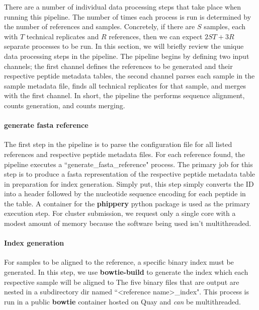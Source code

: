 \documentclass{article}
\begin{document}
There are a number of individual data processing steps that take place when running this pipeline.
The number of times each process is run is determined by the number of references and samples.
Concretely, if there are $S$ samples, each with $T$ technical replicates and $R$ references, then we can expect $2ST + 3R$ separate processes to be run. 
In this section, we will briefly review the unique data processing steps in the pipeline.
The pipeline begins by defining two input channels; 
the first channel defines the references to be generated and their respective peptide metadata tables,
the second channel parses each sample in the sample metadata file, finds all technical replicates for that sample, and merges with the first channel.
In short, the pipeline the performs sequence
alignment, counts generation, and counts merging.

\paragraph{generate fasta reference}
The first step in the pipeline is to parse the configuration file for all listed references and respective peptide metadata files. 
For each reference found, the pipeline executes a ``generate\_fasta\_reference" process.
The primary job for this step is to produce a fasta representation of the respective peptide metadata table in preparation for index generation.
Simply put, this step simply converts the ID into a header followed by the nucleotide sequence encoding for each peptide in the table.
A container for the \textbf{phippery} python package is used as the primary execution step.
For cluster submission, we request only a single core with a modest amount of memory because the software being used isn't multithreaded.

\paragraph{Index generation}
For samples to be aligned to the reference, a specific binary index must be generated.
In this step, we use \textbf{bowtie-build} to generate the index which each respective sample will be aligned to \cite{Langmead2009}
The five binary files that are output are nested in a subdirectory dir named ``<reference name>\_index".
This process is run in a public \textbf{bowtie} container hosted on Quay and \textit{can} be multithreaded. 
\end{document}
